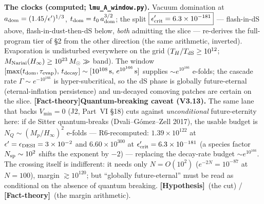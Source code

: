 \documentclass[11pt]{article}
\newcommand{\factth}{\textcolor{green!40!black}{\textbf{[Fact-theory]}}}
\newcommand{\hyp}{\textcolor{orange!80!black}{\textbf{[Hypothesis]}}}
\newcommand{\msun}{M_\odot}
\begin{document}
\textbf{The clocks (computed; \texttt{lmu\_A\_window.py}).} Vacuum domination at $a_{\rm dom}=(1.45/\epsilon')^{1/3}$, $t_{\rm dom}=t_0\,a_{\rm dom}^{3/2}$; the split $\boxed{\epsilon'_{\rm crit}=6.3\times10^{-181}}$ --- flash-in-dS above, flash-in-dust-then-dS below, \emph{both} admitting the slice --- re-derives the full-program tier of \S2 from the other direction (the same arithmetic, inverted). Evaporation is undisturbed everywhere on the grid ($T_H/T_{\rm dS}\ge10^{12}$; $M_{\rm Nariai}(H_\infty)\ge10^{23}\,\msun\gg$ band). The window $[\max(t_{\rm dom},\tau_{\rm evap}),\,t_{\rm decay}]\sim[10^{108}\,\text{s},\,e^{10^{166}}\,\text{s}]$ supplies $\sim e^{10^{166}}$ e-folds; the cascade rate $\Gamma\sim e^{-10^{166}}$ is hyper-subcritical, so the dS phase is globally future-eternal (eternal-inflation persistence) and un-decayed comoving patches are certain on the slice. \factth \textbf{Quantum-breaking caveat (V3.13).} The same lane that backs $V_{\min}=0$ (J2, Part~VI \S18) cuts against \emph{unconditional} future-eternity here: if de Sitter quantum-breaks (Dvali--G\'omez--Zell 2017), the usable budget is $N_Q\sim(M_p/H_\infty)^2$ e-folds --- R6-recomputed: $1.39\times10^{122}$ at $\epsilon'=\epsilon_{\rm DESI}=3\times10^{-2}$ and $6.60\times10^{300}$ at $\epsilon'_{\rm crit}=6.3\times10^{-181}$ (a species factor $N_{\rm sp}\sim10^{2}$ shifts the exponent by $-2$) --- replacing the decay-rate budget $\sim e^{10^{166}}$. The crossing itself is indifferent: it needs only $N=O(10^{2})$ ($e^{-2N}=10^{-87}$ at $N=100$), margin $\gtrsim10^{120}$; but ``globally future-eternal'' must be read as conditional on the absence of quantum breaking. \hyp\ (the cut) / \factth\ (the margin arithmetic).
\end{document}
